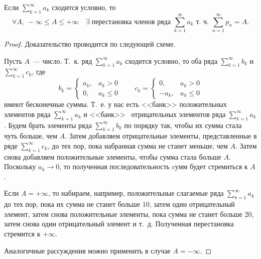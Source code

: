 \documentclass[../../main.tex]{subfiles}
\begin{document}
\begin{thm}[Риман]
	Если $\sum\limits_{k = 1}^{\infty} a_k$ сходится условно, то
	\[\forall A,\ - \infty \leq A \leq + \infty \quad \exists\;
	\text{перестановка членов ряда } \sum\limits_{k = 1}^{\infty} a_k \text{ 
	т.~ч. }
	\sum\limits_{n = 1}^{\infty} p_n = A.\]
	\begin{proof}
		Доказательство проводится по следующей схеме.
		
		Пусть $A$~--- число. Т.~к. ряд
		$\sum\limits_{k = 1}^{\infty} a_k$ сходится условно, то оба ряда
		$\sum\limits_{k = 1}^{\infty} b_k$ и
		$\sum\limits_{k = 1}^{\infty} c_k$, где
		\[b_k = \begin{cases}
			a_k,& a_k > 0\\
			0,& a_k \le 0
		  \end{cases} \qquad
		 c_k = \begin{cases}
			0,& a_k > 0\\
			-a_k,& a_k \le 0
		  \end{cases}\]
		  имеют бесконечные суммы. Т.~е. у нас есть <<банк>> положительных
		  элементов	ряда $\sum\limits_{k = 1}^{\infty} a_k$ и <<банк>> \
		  отрицательных элементов ряда $\sum\limits_{k = 1}^{\infty} a_k$.
		  Будем брать элементы ряда $\sum\limits_{k = 1}^{\infty} b_k$
		  по порядку так, чтобы их сумма стала чуть больше, чем $A$.
		  Затем добавляем отрицательные элементы, представленные в ряде
		  $\sum\limits_{k = 1}^{\infty} c_k$, до тех пор, пока набранная
		  сумма не станет меньше, чем $A$. Затем снова добавляем положительные
		  элементы, чтобы сумма стала больше $A$. Поскольку $a_k \to 0$,
		  то полученная последовательность cумм будет стремиться к $A$.

		  Если $A = +\infty$, то набираем, например, положительные
		  слагаемые ряда $\sum\limits_{k = 1}^{\infty} a_k$ до тех пор,
		  пока их сумма не станет больше $10$, затем один отрицательный элемент,
		  затем снова положительные элементы, пока сумма не станет больше $20$, 
		  затем снова один
		  отрицательный элемент и т.~д. Полученная перестановка стремится к
		  $+ \infty$.
		  
		  Аналогичные рассуждения можно применить в случае $A = -\infty$.
	\end{proof}
\end{thm}
\end{document}
